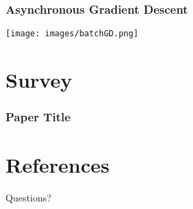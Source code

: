 \documentclass{beamer}
\begin{document}
    \begin{frame}
        \frametitle{Asynchronous Gradient Descent}
        \texttt{[image: images/batchGD.png]}
    \end{frame}

\begin{comment}
                


                
                Slide 5: Results
                
                Training Efficiency:
                Reduced training time by half compared to traditional methods using GPUs.
    Performance:
    Outperformed state-of-the-art benchmarks in Atari game simulations.
    Demonstrated robustness across various tasks and environments.
    
    Slide 6: Implications
    
    Scalability:
    Demonstrates potential for scalable RL applications using CPU-based training.
    Future Work:
    Further exploration of asynchronous methods in different RL domains.
    Application to more complex and diverse tasks.
    
    Slide 7: Conclusion
    
    Summary:
    Asynchronous methods provide a robust and efficient approach to deep reinforcement learning.
    Parallel actor-learners contribute significantly to training stability and performance.
    Significance:
    Paves the way for broader and more accessible applications of deep reinforcement learning.
    
\end{comment}
    
    \section{Survey}
    \begin{frame}
        \frametitle{Paper Title}
    \end{frame}
    
    \section{References}
    \frame{\printbibliography}
    
    \begin{frame}
        Questions?
    \end{frame}
    
\end{document}

